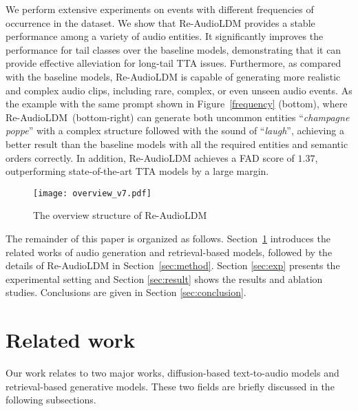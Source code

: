 \documentclass{article}
\begin{document}
We perform extensive experiments on events with different frequencies of occurrence in the dataset. We show that Re-AudioLDM provides a stable performance among a variety of audio entities. It significantly improves the performance for tail classes over the baseline models, demonstrating that it can provide effective alleviation for long-tail TTA issues. Furthermore, as compared with the baseline models, Re-AudioLDM is capable of generating more realistic and complex audio clips, including rare, complex, or even unseen audio events. As the example with the same prompt shown in Figure~\ref{frequency} (bottom), where Re-AudioLDM~(bottom-right) can generate both uncommon entities ``\textit{champagne poppe}'' with a complex structure followed with the sound of ``\textit{laugh}'', achieving a better result than the baseline models with all the required entities and semantic orders correctly. In addition, Re-AudioLDM achieves a FAD score of $1.37$, outperforming state-of-the-art TTA models by a large margin. 

  

\begin{figure*}[htbp]
    \centering
    \texttt{[image: overview\_v7.pdf]}
    \caption{The overview structure of Re-AudioLDM}
    \label{fig:overview}
\end{figure*}

The remainder of this paper is organized as follows. Section~\ref{sec:related_works} introduces the related works of audio generation and retrieval-based models, followed by the details of Re-AudioLDM in Section~\ref{sec:method}. Section \ref{sec:exp} presents the experimental setting and Section \ref{sec:result} shows the results and ablation studies. Conclusions are given in Section \ref{sec:conclusion}.

\section{Related work}
\label{sec:related_works}
Our work relates to two major works, diffusion-based text-to-audio models and retrieval-based generative models. These two fields are briefly discussed in the following subsections.
\end{document}
